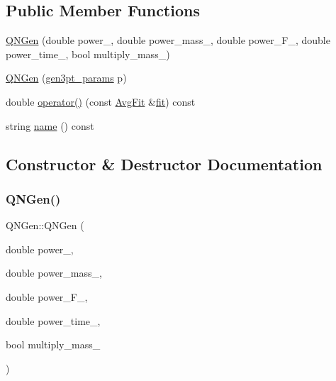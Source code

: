 \subsection*{Public Member Functions}
\begin{DoxyCompactItemize}
\item 
\mbox{\hyperlink{classQNGen_a7d498a5b182d4b003114578647f317aa}{Q\+N\+Gen}} (double power\+\_\+, double power\+\_\+mass\+\_\+, double power\+\_\+\+F\+\_\+, double power\+\_\+time\+\_\+, bool multiply\+\_\+mass\+\_\+)
\item 
\mbox{\hyperlink{classQNGen_aba9f5e01972ba763a0491e2bbad47680}{Q\+N\+Gen}} (\mbox{\hyperlink{structgen3pt__params}{gen3pt\+\_\+params}} p)
\item 
double \mbox{\hyperlink{classQNGen_a318c2cf305ceb9e81bef665364686408}{operator()}} (const \mbox{\hyperlink{classAvgFit}{Avg\+Fit}} \&\mbox{\hyperlink{src_2lib_2three__point__timeslice__fitting_8h_aa079c61e69a3946e3351db64a3478612}{fit}}) const
\item 
string \mbox{\hyperlink{classQNGen_a9fcf4cc02a027c054a889421898175fa}{name}} () const
\end{DoxyCompactItemize}


\subsection{Constructor \& Destructor Documentation}
\mbox{\label{classQNGen_a7d498a5b182d4b003114578647f317aa}} 
\subsubsection{\texorpdfstring{QNGen()}{QNGen()}\hspace{0.1cm}{\footnotesize\ttfamily [1/2]}}
{\footnotesize\ttfamily Q\+N\+Gen\+::\+Q\+N\+Gen (\begin{DoxyParamCaption}\item[{double}]{power\+\_\+,  }\item[{double}]{power\+\_\+mass\+\_\+,  }\item[{double}]{power\+\_\+\+F\+\_\+,  }\item[{double}]{power\+\_\+time\+\_\+,  }\item[{bool}]{multiply\+\_\+mass\+\_\+ }\end{DoxyParamCaption})\hspace{0.3cm}{\ttfamily [inline]}}

